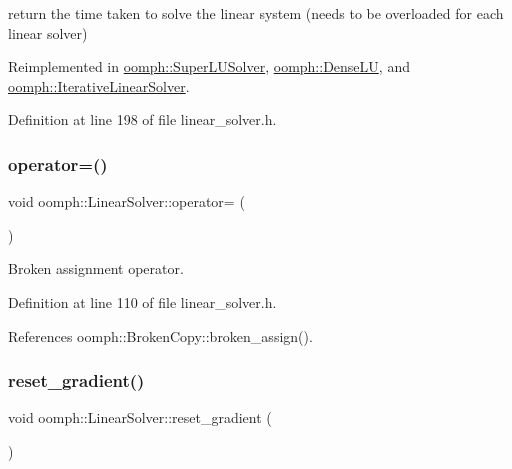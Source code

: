 return the time taken to solve the linear system (needs to be overloaded for each linear solver) 



Reimplemented in \hyperlink{classoomph_1_1SuperLUSolver_a39e375e5ca81863127fe6d381ef97b65}{oomph\+::\+Super\+L\+U\+Solver}, \hyperlink{classoomph_1_1DenseLU_aabe93cf400bb488f0bc08755ee0dfde4}{oomph\+::\+Dense\+LU}, and \hyperlink{classoomph_1_1IterativeLinearSolver_a65544b6c2090d3d019f48e047e338352}{oomph\+::\+Iterative\+Linear\+Solver}.



Definition at line 198 of file linear\+\_\+solver.\+h.

\mbox{\label{classoomph_1_1LinearSolver_aeb1820234b9335b2a5072e5ee19306d4}} 
\subsubsection{\texorpdfstring{operator=()}{operator=()}}
{\footnotesize\ttfamily void oomph\+::\+Linear\+Solver\+::operator= (\begin{DoxyParamCaption}\item[{const \hyperlink{classoomph_1_1LinearSolver}{Linear\+Solver} \&}]{ }\end{DoxyParamCaption})\hspace{0.3cm}{\ttfamily [inline]}}



Broken assignment operator. 



Definition at line 110 of file linear\+\_\+solver.\+h.



References oomph\+::\+Broken\+Copy\+::broken\+\_\+assign().

\mbox{\label{classoomph_1_1LinearSolver_aceef502cbdf826cdf6aa31f5803982e0}} 
\subsubsection{\texorpdfstring{reset\+\_\+gradient()}{reset\_gradient()}}
{\footnotesize\ttfamily void oomph\+::\+Linear\+Solver\+::reset\+\_\+gradient (\begin{DoxyParamCaption}{ }\end{DoxyParamCaption})\hspace{0.3cm}{\ttfamily [inline]}}



